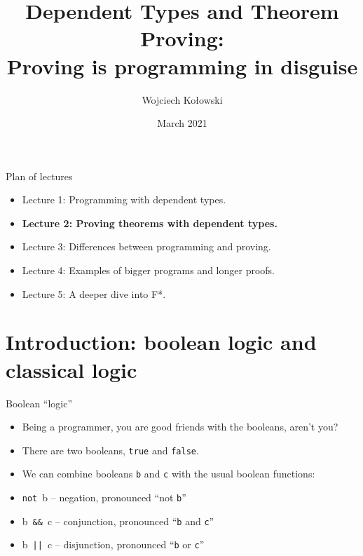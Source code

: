 \documentclass{beamer}
\title{Dependent Types and Theorem Proving: \\Proving is programming in disguise}
\author{Wojciech Kołowski}
\date{March 2021}
\newcommand{\m}[1]{\texttt{#1}}
\newcommand{\notb}[1]{not #1}
\newcommand{\andb}[2]{#1 \&\& #2}
\newcommand{\orb}[2]{#1 || #2}
\newcommand{\implb}[2]{#1 ==> #2}
\newcommand{\iffb}[2]{#1 <=> #2}
\newcommand{\mnotb}[1]{\m{not}\ #1}
\newcommand{\mandb}[2]{#1\ \m{\&\&}\ #2}
\newcommand{\morb}[2]{#1\ \m{||}\ #2}
\begin{document}
\frame{\titlepage}

\begin{frame}{Plan of lectures}
\begin{itemize}
	\item Lecture 1: Programming with dependent types.
	\item \textbf{Lecture 2: Proving theorems with dependent types.}
	\item Lecture 3: Differences between programming and proving.
	\item Lecture 4: Examples of bigger programs and longer proofs.
	\item Lecture 5: A deeper dive into F*.
\end{itemize}
\end{frame}

\frame{\tableofcontents}

\section{Introduction: boolean logic and classical logic}

\begin{frame}{Boolean ``logic''}
\begin{itemize}
	\item Being a programmer, you are good friends with the booleans, aren't you?
	\item There are two booleans, \m{true} and \m{false}.
	\item We can combine booleans \m{b} and \m{c} with the usual boolean functions:
	\item \mnotb{b} -- negation, pronounced ``not \m{b}''
	\item \mandb{b}{c} -- conjunction, pronounced ``\m{b} and \m{c}''
	\item \morb{b}{c} -- disjunction, pronounced ``\m{b} or \m{c}''
\end{itemize}
\end{frame}
\end{document}
